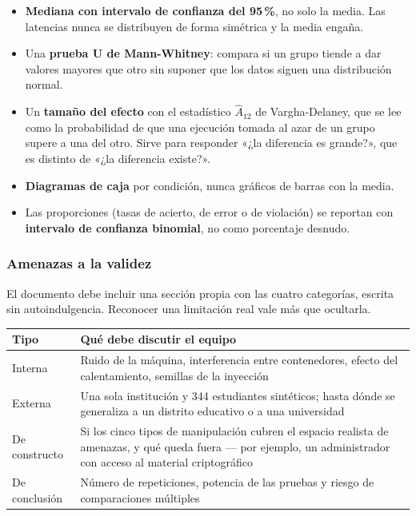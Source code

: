 \documentclass[11pt,a4paper]{article}
\begin{document}
	\begin{itemize}[leftmargin=*,itemsep=4pt]
		\item \textbf{Mediana con intervalo de confianza del 95\,\%}, no solo la media. Las latencias nunca se distribuyen de forma simétrica y la media engaña.
		\item Una \textbf{prueba U de Mann-Whitney}: compara si un grupo tiende a dar valores mayores que otro sin suponer que los datos siguen una distribución normal.
		\item Un \textbf{tamaño del efecto} con el estadístico $\hat{A}_{12}$ de Vargha-Delaney, que se lee como la probabilidad de que una ejecución tomada al azar de un grupo supere a una del otro. Sirve para responder «¿la diferencia es grande?», que es distinto de «¿la diferencia existe?».
		\item \textbf{Diagramas de caja} por condición, nunca gráficos de barras con la media.
		\item Las proporciones (tasas de acierto, de error o de violación) se reportan con \textbf{intervalo de confianza binomial}, no como porcentaje desnudo.
	\end{itemize}
	
	\subsubsection{Amenazas a la validez}
	
	El documento debe incluir una sección propia con las cuatro categorías, escrita sin autoindulgencia. Reconocer una limitación real vale más que ocultarla.
	
	\begin{center}
		\small
		\begin{tabular}{@{}p{3.0cm}p{11.9cm}@{}}
			\toprule
			\textbf{Tipo} & \textbf{Qué debe discutir el equipo} \\
			\midrule
			Interna & Ruido de la máquina, interferencia entre contenedores, efecto del calentamiento, semillas de la inyección \\
			\addlinespace
			Externa & Una sola institución y 344 estudiantes sintéticos; hasta dónde se generaliza a un distrito educativo o a una universidad \\
			\addlinespace
			De constructo & Si los cinco tipos de manipulación cubren el espacio realista de amenazas, y qué queda fuera --- por ejemplo, un administrador con acceso al material criptográfico \\
			\addlinespace
			De conclusión & Número de repeticiones, potencia de las pruebas y riesgo de comparaciones múltiples \\
			\bottomrule
		\end{tabular}
	\end{center}
	
\end{document}
